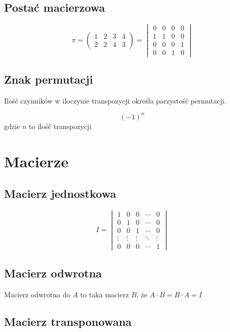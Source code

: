 \documentclass{../notatki}
\begin{document}
\subsection{Postać macierzowa}

$$
\pi = 
\begin{pmatrix}
    1 & 2 & 3 & 4\\
    2 & 2 & 4 & 3
\end{pmatrix}
= 
\begin{vmatrix}
    0 & 0 & 0 & 0\\
    1 & 1 & 0 & 0\\
    0 & 0 & 0 & 1\\
    0 & 0 & 1 & 0
\end{vmatrix}
$$

\subsection{Znak permutacji}

Ilość czynników w iloczynie transpozycji określa parzystość permutacji.

$$(-1)^n$$ gdzie $n$ to ilość transpozycji

\section{Macierze}

\subsection{Macierz jednostkowa}

$$
I =
\begin{vmatrix}
    1 & 0 & 0 & \cdots & 0 \\
    0 & 1 & 0 & \cdots & 0 \\
    0 & 0 & 1 & \cdots & 0 \\
    \vdots & \vdots & \vdots & \ddots & \vdots \\
    0 & 0 & 0 & \cdots & 1
\end{vmatrix}
$$

\subsection{Macierz odwrotna}

Macierz odwrotna do $A$ to taka macierz $B$, że $A \cdot B = B \cdot A = I$

\subsection{Macierz transponowana}
\end{document}
